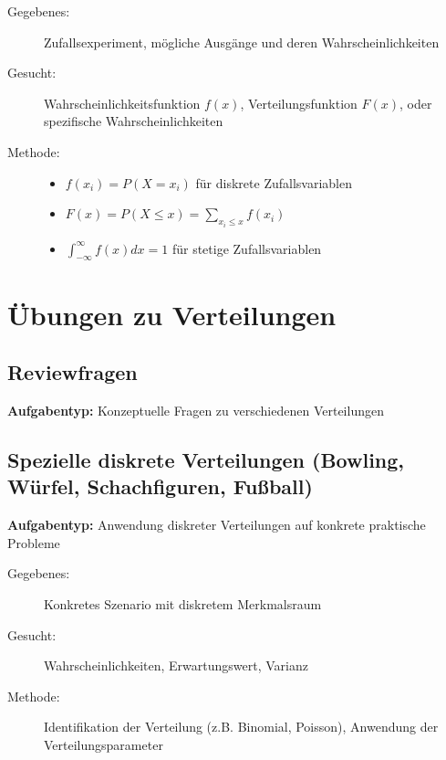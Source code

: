 \documentclass[12pt, a4paper, titlepage, ngerman]{scrartcl}
\begin{document}
\begin{description}
  \item[Gegebenes:] Zufallsexperiment, mögliche Ausgänge und deren Wahrscheinlichkeiten
  \item[Gesucht:] Wahrscheinlichkeitsfunktion $f(x)$, Verteilungsfunktion $F(x)$, oder spezifische Wahrscheinlichkeiten
  \item[Methode:] 
    \begin{itemize}
      \item $f(x_i) = P(X = x_i)$ für diskrete Zufallsvariablen
      \item $F(x) = P(X \leq x) = \sum_{x_i \leq x} f(x_i)$
      \item $\int_{-\infty}^{\infty} f(x) dx = 1$ für stetige Zufallsvariablen
    \end{itemize}
\end{description}

\section{Übungen zu Verteilungen}

\subsection{Reviewfragen}

\textbf{Aufgabentyp:} Konzeptuelle Fragen zu verschiedenen Verteilungen

\subsection{Spezielle diskrete Verteilungen (Bowling, Würfel, Schachfiguren, Fußball)}

\textbf{Aufgabentyp:} Anwendung diskreter Verteilungen auf konkrete praktische Probleme

\begin{description}
  \item[Gegebenes:] Konkretes Szenario mit diskretem Merkmalsraum
  \item[Gesucht:] Wahrscheinlichkeiten, Erwartungswert, Varianz
  \item[Methode:] Identifikation der Verteilung (z.B. Binomial, Poisson), Anwendung der Verteilungsparameter
\end{description}
\end{document}

